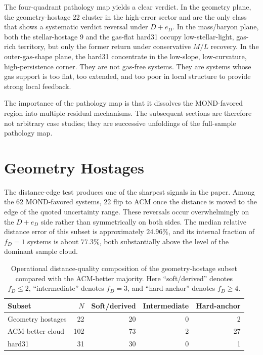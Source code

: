 ﻿\documentclass[aps,prd,twocolumn,superscriptaddress,longbibliography,nofootinbib,floatfix,10pt]{revtex4-2}
\begin{document}
The four-quadrant pathology map yields a clear verdict. In the geometry plane,
the geometry-hostage 22 cluster in the high-error sector and are the only class
that shows a systematic verdict reversal under $D+e_D$. In the mass/baryon
plane, both the stellar-hostage 9 and the gas-flat hard31 occupy
low-stellar-light, gas-rich territory, but only the former return under
conservative $M/L$ recovery. In the outer-gas-shape plane, the hard31
concentrate in the low-slope, low-curvature, high-persistence corner. They are
not gas-free systems. They are systems whose gas support is too flat, too
extended, and too poor in local structure to provide strong local feedback.

The importance of the pathology map is that it dissolves the MOND-favored
region into multiple residual mechanisms. The subsequent sections are therefore
not arbitrary case studies; they are successive unfoldings of the full-sample
pathology map.

\section{Geometry Hostages}

The distance-edge test produces one of the sharpest signals in the paper.
Among the 62 MOND-favored systems, 22 flip to ACM once the distance is moved to
the edge of the quoted uncertainty range. These reversals occur overwhelmingly
on the $D + e_D$ side rather than symmetrically on both sides. The median
relative distance error of this subset is approximately $24.96\%$, and its
internal fraction of $f_D=1$ systems is about $77.3\%$, both substantially
above the level of the dominant sample cloud.

\begin{table}[t]
\centering
\small
\caption{
Operational distance-quality composition of the geometry-hostage subset
compared with the ACM-better majority. Here ``soft/derived'' denotes
$f_D \leq 2$, ``intermediate'' denotes $f_D = 3$, and ``hard-anchor''
denotes $f_D \geq 4$.
}
\label{tab:distance-quality}
\begin{tabular}{lrrrr}
\toprule
Subset & $N$ & Soft/derived & Intermediate & Hard-anchor \\
\midrule
Geometry hostages & 22 & 20 & 0 & 2 \\
ACM-better cloud & 102 & 73 & 2 & 27 \\
hard31 & 31 & 30 & 0 & 1 \\
\bottomrule
\end{tabular}
\end{table}
\end{document}
